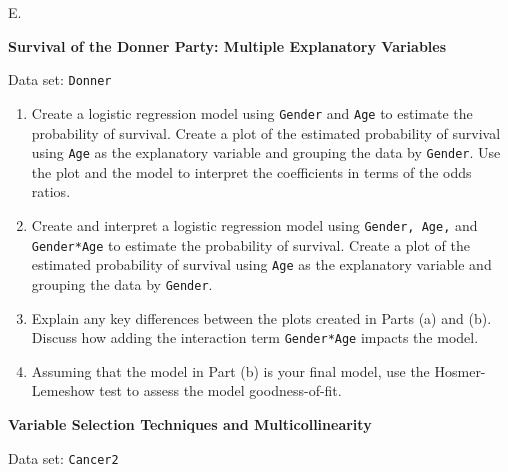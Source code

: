 \documentclass[
]{report}
\newcounter{excount}
\renewcommand{\theexcount}{E\arabic{excount}}
\begin{document}
\begin{list}{\theexcount.}{ \setlength{\itemsep}{1.2em}}
  \item \textbf{Survival of the Donner Party: Multiple Explanatory Variables}

Data set: \texttt{Donner}

  \begin{enumerate}
    \item Create a logistic regression model using \texttt{Gender} and \texttt{Age} to estimate the probability of survival. Create a plot of the estimated probability of survival using \texttt{Age} as the explanatory variable and grouping the data by \texttt{Gender}. Use the plot and the model to interpret the coefficients in terms of the odds ratios.
    \item Create and interpret a logistic regression model using \texttt{Gender, Age,} and \texttt{Gender*Age} to estimate the probability of survival. Create a plot of the estimated probability of survival using \texttt{Age} as the explanatory variable and grouping the data by \texttt{Gender}.
    \item Explain any key differences between the plots created in Parts (a) and (b). Discuss how adding the interaction term \texttt{Gender*Age} impacts the model.
    \item Assuming that the model in Part (b) is your final model, use the Hosmer-Lemeshow test to assess the model goodness-of-fit.
  \end{enumerate}

  \item \textbf{Variable Selection Techniques and Multicollinearity}

Data set: \texttt{Cancer2}


\end{list}
\end{document}
